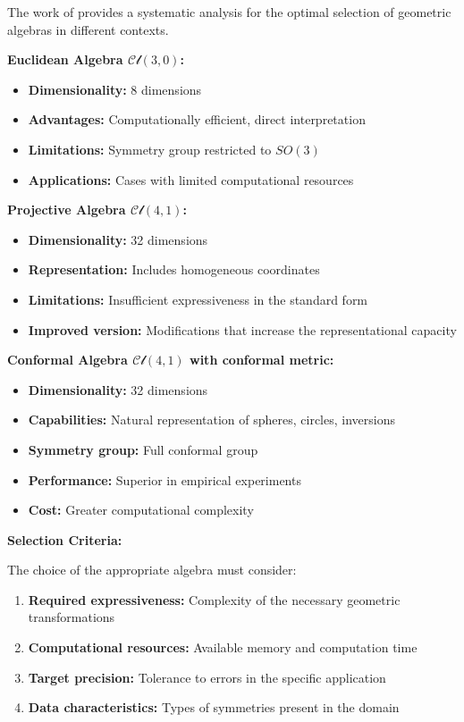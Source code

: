 The work of \citet{dehaan2024euclidean} provides a systematic analysis for the optimal selection of geometric algebras in different contexts.

\textbf{Euclidean Algebra $\mathcal{Cl}(3,0)$:}
\begin{itemize}
    \item \textbf{Dimensionality:} 8 dimensions
    \item \textbf{Advantages:} Computationally efficient, direct interpretation
    \item \textbf{Limitations:} Symmetry group restricted to $SO(3)$
    \item \textbf{Applications:} Cases with limited computational resources
\end{itemize}

\textbf{Projective Algebra $\mathcal{Cl}(4,1)$:}
\begin{itemize}
    \item \textbf{Dimensionality:} 32 dimensions
    \item \textbf{Representation:} Includes homogeneous coordinates
    \item \textbf{Limitations:} Insufficient expressiveness in the standard form
    \item \textbf{Improved version:} Modifications that increase the representational capacity
\end{itemize}

\textbf{Conformal Algebra $\mathcal{Cl}(4,1)$ with conformal metric:}
\begin{itemize}
    \item \textbf{Dimensionality:} 32 dimensions
    \item \textbf{Capabilities:} Natural representation of spheres, circles, inversions
    \item \textbf{Symmetry group:} Full conformal group
    \item \textbf{Performance:} Superior in empirical experiments
    \item \textbf{Cost:} Greater computational complexity
\end{itemize}

\textbf{Selection Criteria:}

The choice of the appropriate algebra must consider:
\begin{enumerate}
    \item \textbf{Required expressiveness:} Complexity of the necessary geometric transformations
    \item \textbf{Computational resources:} Available memory and computation time
    \item \textbf{Target precision:} Tolerance to errors in the specific application
    \item \textbf{Data characteristics:} Types of symmetries present in the domain
\end{enumerate}

